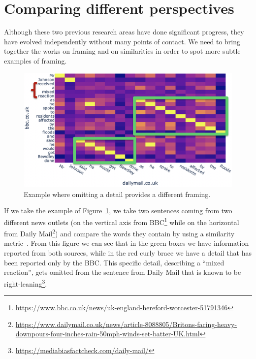 \section{Comparing different perspectives}
\label{sec:lit_gap}
Although these two previous research areas have done significant progress, they have evolved independently without many points of contact.
We need to bring together the works on framing and on similarities in order to spot more subtle examples of framing.

\begin{figure}[!htb]
    \centering
    \includegraphics[width=\linewidth]{figures/johnson_flood.png}
    \caption{Example where omitting a detail provides a different framing.}
    \label{fig:johnson_flood}
\end{figure}

If we take the example of Figure~\ref{fig:johnson_flood}, we take two sentences coming from two different news outlets (on the vertical axis from BBC\footnote{\url{https://www.bbc.co.uk/news/uk-england-hereford-worcester-51791346}} while on the horizontal from Daily Mail\footnote{\url{https://www.dailymail.co.uk/news/article-8088805/Britons-facing-heavy-downpours-four-inches-rain-50mph-winds-set-batter-UK.html}}) and compare the words they contain by using a similarity metric~\cite{cer2018universal}.
From this figure we can see that in the green boxes we have information reported from both sources, while in the red curly brace we have a detail that has been reported only by the BBC.
This specific detail, describing a ``mixed reaction'', gets omitted from the sentence from Daily Mail that is known to be right-leaning\footnote{\url{https://mediabiasfactcheck.com/daily-mail/}}.

